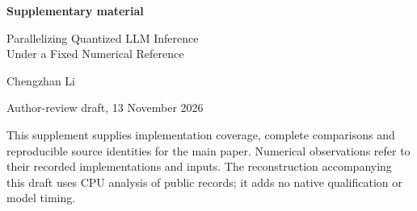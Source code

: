 \documentclass[10pt,a4paper]{article}
\begin{document}
\begin{center}
{\Large\bfseries Supplementary material}\par\medskip
{\large Parallelizing Quantized LLM Inference\\Under a Fixed Numerical Reference}\par\medskip
Chengzhan Li\par
Author-review draft, 13 November 2026
\end{center}
\noindent This supplement supplies implementation coverage, complete comparisons and reproducible source identities for the main paper. Numerical observations refer to their recorded implementations and inputs. The reconstruction accompanying this draft uses CPU analysis of public records; it adds no native qualification or model timing.






\end{document}
